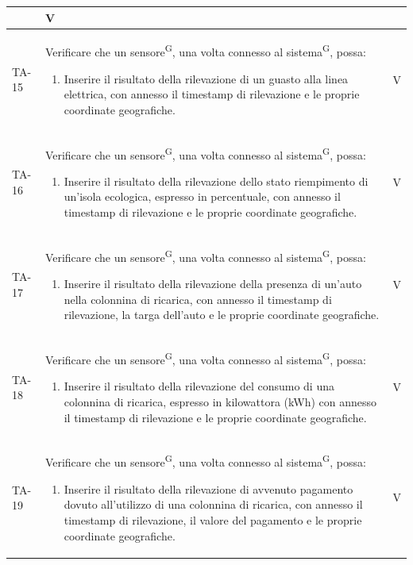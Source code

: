 \documentclass[8pt]{article}
\newcommand{\glossterm}[1]{#1\textsuperscript{G}} %
\begin{document}
\begin{longtable}{|>{\centering}p{2cm}|>{\RaggedRight}m{12cm}|>{\centering\arraybackslash}p{2cm}|}
\begin{enumerate}
    \end{enumerate}
    & V \\
    \hline
    TA-15 &
    Verificare che un \glossterm{sensore}, una volta connesso al \glossterm{sistema}, possa:
    \begin{enumerate}
    \item Inserire il risultato della rilevazione di un guasto alla linea elettrica, con annesso il timestamp di rilevazione e le proprie coordinate geografiche. 
    \end{enumerate}
    & V \\
    \hline
    TA-16 &
    Verificare che un \glossterm{sensore}, una volta connesso al \glossterm{sistema}, possa:
    \begin{enumerate}
    \item Inserire il risultato della rilevazione dello stato riempimento di un'isola ecologica, espresso in percentuale, con annesso il timestamp di rilevazione e le proprie coordinate geografiche. 
    \end{enumerate}
    & V \\
    \hline
    TA-17 &
    Verificare che un \glossterm{sensore}, una volta connesso al \glossterm{sistema}, possa:
    \begin{enumerate}
    \item Inserire il risultato della rilevazione della presenza di un'auto nella colonnina di ricarica, con annesso il timestamp di rilevazione, la targa dell'auto e le proprie coordinate geografiche.  
    \end{enumerate}
    & V \\
    \hline
    TA-18 &
    Verificare che un \glossterm{sensore}, una volta connesso al \glossterm{sistema}, possa:
    \begin{enumerate}
    \item Inserire il risultato della rilevazione del consumo di una colonnina di ricarica, espresso in kilowattora (kWh) con annesso il timestamp di rilevazione e le proprie coordinate geografiche.  
    \end{enumerate}
    & V \\
    \hline
    TA-19 &
    Verificare che un \glossterm{sensore}, una volta connesso al \glossterm{sistema}, possa:
    \begin{enumerate}
    \item Inserire il risultato della rilevazione di avvenuto pagamento dovuto all'utilizzo di una colonnina di ricarica, con annesso il timestamp di rilevazione, il valore del pagamento e le proprie coordinate geografiche. 
    \end{enumerate}
    & V \\
    \hline
\end{longtable}
\end{document}
